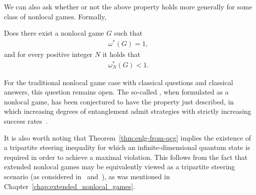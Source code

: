 We can also ask whether or not the above property holds more generally for some class of nonlocal games. Formally, 
\begin{question}
	Does there exist a nonlocal game $G$ such that 
	\begin{align}
		\omega^*(G) = 1,
	\end{align}
	and for every positive integer $N$ it holds that 
	\begin{align}
		\omega_N^*(G) < 1.
	\end{align}
\end{question}
For the traditional nonlocal game case with classical questions and classical answers, this question remains open. The so-called , when formulated as a nonlocal game, has been conjectured to have the property just described, in which increasing degrees of entanglement admit strategies with strictly increasing success rates~\cite{Pal2009}.

It is also worth noting that Theorem~\ref{thm:enlg-from-qcg} implies the existence of a tripartite steering inequality for which an infinite-dimensional quantum state is required in order to achieve a maximal violation. This follows from the fact that extended nonlocal games may be equivalently viewed as a tripartite steering scenario (as considered in~\cite{Cavalcanti2015} and~\cite{Sainz2015}), as was mentioned in Chapter~\ref{chap:extended_nonlocal_games}. 

